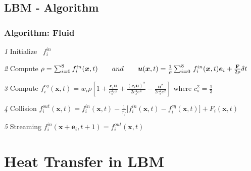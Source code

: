 \documentclass[10pt]{beamer}
\begin{document}
\subsection{LBM - Algorithm}
\begin{frame}[plain] \frametitle{Algorithm: Fluid} 
\textit{1} Initialize $ \enspace f_i ^{in} $ \\ \vspace{2.5em}

\pause 
\textit{2} Compute 
$ \rho = \sum_{i=0}^{8} f_i ^{in}(\boldsymbol{x},t)
          \hspace{2 em}  and  \hspace{2 em}
      	 \boldsymbol{u}(\boldsymbol{x},t) = \frac{1}{\rho} \sum_{i=0}^{8} \, f_i ^{in}(\boldsymbol{x},t) \boldsymbol{e}_i +  \frac{\textbf{F}}{2 \rho} \delta t 
      	 $ \\ \vspace{2.5em}

\pause
\textit{3} Compute 
$  f_i ^{eq}(\boldsymbol{x},t) =  w_i \rho 
 \left[ 1 + \frac{\boldsymbol{e}_i \boldsymbol{u}}{c_s^2 e^2} + \frac{ (\boldsymbol{e}_i \boldsymbol{u})^2}{2 c_s^4 e^4} - \frac{\boldsymbol{u}^2 } {2c_s^2 e^2} \right] $  where $c_s^2 = \frac{1}{3}$
 \\ \vspace{2.5em}

\pause 
\textit{4} Collision  
$  f_i ^{out}(\boldsymbol{x},t) = f_i^{in}(\boldsymbol{x},t) - \frac{1}{\tau_f} \bigg[ f_i^{in}(\boldsymbol{x},t) - f_i^{eq}(\boldsymbol{x},t) \bigg] + F_i(\bm{x}, t ) $ \\ \vspace{2.5em}

\pause
\textit{5} Streaming 
$  f_i ^{in}(\boldsymbol{x} + \boldsymbol{e}_i ,t+1) =  f_i^{out} (\boldsymbol{x},t) $ 

\end{frame} 

\section{Heat Transfer in LBM}
\end{document}
